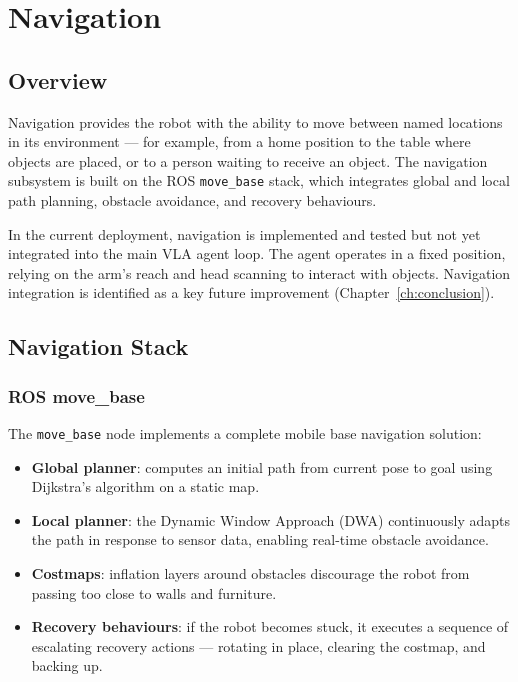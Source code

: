 \chapter{Navigation}
\label{ch:navigation}

\section{Overview}

Navigation provides the robot with the ability to move between named locations in
its environment — for example, from a home position to the table where objects are
placed, or to a person waiting to receive an object.
The navigation subsystem is built on the ROS \texttt{move\_base} stack, which
integrates global and local path planning, obstacle avoidance, and recovery behaviours.

In the current deployment, navigation is implemented and tested but not yet integrated
into the main VLA agent loop.
The agent operates in a fixed position, relying on the arm's reach and head scanning
to interact with objects.
Navigation integration is identified as a key future improvement (Chapter~\ref{ch:conclusion}).

\section{Navigation Stack}

\subsection{ROS move\_base}

The \texttt{move\_base} node implements a complete mobile base navigation solution:

\begin{itemize}[noitemsep]
  \item \textbf{Global planner}: computes an initial path from current pose to goal
        using Dijkstra's algorithm on a static map.
  \item \textbf{Local planner}: the Dynamic Window Approach (DWA) continuously adapts
        the path in response to sensor data, enabling real-time obstacle avoidance.
  \item \textbf{Costmaps}: inflation layers around obstacles discourage the robot from
        passing too close to walls and furniture.
  \item \textbf{Recovery behaviours}: if the robot becomes stuck, it executes a
        sequence of escalating recovery actions — rotating in place, clearing the
        costmap, and backing up.
\end{itemize}

